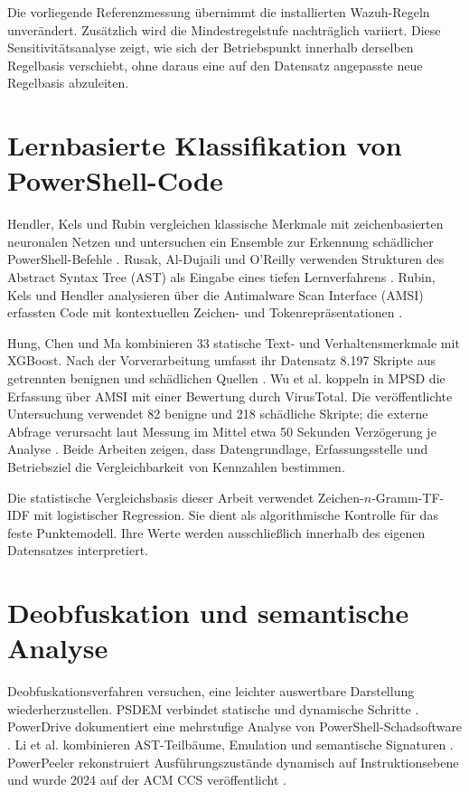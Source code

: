 \documentclass[12pt,a4paper,oneside,parskip=half]{scrreprt}
\begin{document}
Die vorliegende Referenzmessung übernimmt die installierten Wazuh-Regeln unverändert. Zusätzlich wird die Mindestregelstufe nachträglich variiert. Diese Sensitivitätsanalyse zeigt, wie sich der Betriebspunkt innerhalb derselben Regelbasis verschiebt, ohne daraus eine auf den Datensatz angepasste neue Regelbasis abzuleiten.

\section{Lernbasierte Klassifikation von PowerShell-Code}
Hendler, Kels und Rubin vergleichen klassische Merkmale mit zeichenbasierten neuronalen Netzen und untersuchen ein Ensemble zur Erkennung schädlicher PowerShell-Befehle \cite{hendler2018}. Rusak, Al-Dujaili und O'Reilly verwenden Strukturen des Abstract Syntax Tree (AST) als Eingabe eines tiefen Lernverfahrens \cite{rusak2018}. Rubin, Kels und Hendler analysieren über die Antimalware Scan Interface (AMSI) erfassten Code mit kontextuellen Zeichen- und Tokenrepräsentationen \cite{rubin2020}.

Hung, Chen und Ma kombinieren 33 statische Text- und Verhaltensmerkmale mit XGBoost. Nach der Vorverarbeitung umfasst ihr Datensatz 8.197 Skripte aus getrennten benignen und schädlichen Quellen \cite{hung2024}. Wu et al. koppeln in MPSD die Erfassung über AMSI mit einer Bewertung durch VirusTotal. Die veröffentlichte Untersuchung verwendet 82 benigne und 218 schädliche Skripte; die externe Abfrage verursacht laut Messung im Mittel etwa 50 Sekunden Verzögerung je Analyse \cite{wu2024mpsd}. Beide Arbeiten zeigen, dass Datengrundlage, Erfassungsstelle und Betriebsziel die Vergleichbarkeit von Kennzahlen bestimmen.

Die statistische Vergleichsbasis dieser Arbeit verwendet Zeichen-\(n\)-Gramm-TF-IDF mit logistischer Regression. Sie dient als algorithmische Kontrolle für das feste Punktemodell. Ihre Werte werden ausschließlich innerhalb des eigenen Datensatzes interpretiert.

\section{Deobfuskation und semantische Analyse}
Deobfuskationsverfahren versuchen, eine leichter auswertbare Darstellung wiederherzustellen. PSDEM verbindet statische und dynamische Schritte \cite{liu2018}. PowerDrive dokumentiert eine mehrstufige Analyse von PowerShell-Schadsoftware \cite{ugarte2019}. Li et al. kombinieren AST-Teilbäume, Emulation und semantische Signaturen \cite{li2019}. PowerPeeler rekonstruiert Ausführungszustände dynamisch auf Instruktionsebene und wurde 2024 auf der ACM CCS veröffentlicht \cite{li2024powerpeeler}.
\end{document}
